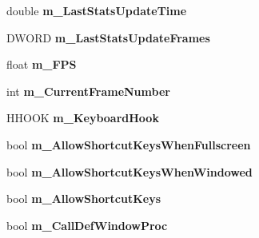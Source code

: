 \begin{DoxyCompactItemize}
\item 
\hypertarget{struct_d_x_u_t_state_1_1_s_t_a_t_e_a7b004ce686d86fa27c8861ed837f9fed}{double {\bfseries m\+\_\+\+Last\+Stats\+Update\+Time}}\label{struct_d_x_u_t_state_1_1_s_t_a_t_e_a7b004ce686d86fa27c8861ed837f9fed}

\item 
\hypertarget{struct_d_x_u_t_state_1_1_s_t_a_t_e_af2da3ea30f88e1495ada8b7fe913b698}{D\+W\+O\+R\+D {\bfseries m\+\_\+\+Last\+Stats\+Update\+Frames}}\label{struct_d_x_u_t_state_1_1_s_t_a_t_e_af2da3ea30f88e1495ada8b7fe913b698}

\item 
\hypertarget{struct_d_x_u_t_state_1_1_s_t_a_t_e_abc7637b0968147d988ae1b0b5412f6cc}{float {\bfseries m\+\_\+\+F\+P\+S}}\label{struct_d_x_u_t_state_1_1_s_t_a_t_e_abc7637b0968147d988ae1b0b5412f6cc}

\item 
\hypertarget{struct_d_x_u_t_state_1_1_s_t_a_t_e_afcc6c23946a4055750772a78f92f9550}{int {\bfseries m\+\_\+\+Current\+Frame\+Number}}\label{struct_d_x_u_t_state_1_1_s_t_a_t_e_afcc6c23946a4055750772a78f92f9550}

\item 
\hypertarget{struct_d_x_u_t_state_1_1_s_t_a_t_e_ae77d30129b56d705a0b926181cfa1669}{H\+H\+O\+O\+K {\bfseries m\+\_\+\+Keyboard\+Hook}}\label{struct_d_x_u_t_state_1_1_s_t_a_t_e_ae77d30129b56d705a0b926181cfa1669}

\item 
\hypertarget{struct_d_x_u_t_state_1_1_s_t_a_t_e_ae9bf869e6bde0ba638b5385fa64f73c3}{bool {\bfseries m\+\_\+\+Allow\+Shortcut\+Keys\+When\+Fullscreen}}\label{struct_d_x_u_t_state_1_1_s_t_a_t_e_ae9bf869e6bde0ba638b5385fa64f73c3}

\item 
\hypertarget{struct_d_x_u_t_state_1_1_s_t_a_t_e_a66398b1940d823c10e541198ab7bb60c}{bool {\bfseries m\+\_\+\+Allow\+Shortcut\+Keys\+When\+Windowed}}\label{struct_d_x_u_t_state_1_1_s_t_a_t_e_a66398b1940d823c10e541198ab7bb60c}

\item 
\hypertarget{struct_d_x_u_t_state_1_1_s_t_a_t_e_a1993cb637d5f32d905968688169da93f}{bool {\bfseries m\+\_\+\+Allow\+Shortcut\+Keys}}\label{struct_d_x_u_t_state_1_1_s_t_a_t_e_a1993cb637d5f32d905968688169da93f}

\item 
\hypertarget{struct_d_x_u_t_state_1_1_s_t_a_t_e_a1c6fea5f6353b2dfd213a97a42bca656}{bool {\bfseries m\+\_\+\+Call\+Def\+Window\+Proc}}\label{struct_d_x_u_t_state_1_1_s_t_a_t_e_a1c6fea5f6353b2dfd213a97a42bca656}


\end{DoxyCompactItemize}
